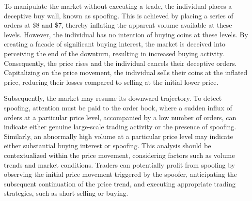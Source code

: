 To manipulate the market without executing a trade, the individual places a deceptive buy wall, known as spoofing. This
is achieved by placing a series of orders at \$8 and \$7, thereby inflating the apparent volume available at these levels.
However, the individual has no intention of buying coins at these levels. By creating a facade of significant buying
interest, the market is deceived into perceiving the end of the downturn, resulting in increased buying activity.
Consequently, the price rises and the individual cancels their deceptive orders. Capitalizing on the price movement, the
individual sells their coins at the inflated price, reducing their losses compared to selling at the initial lower price.

Subsequently, the market may resume its downward trajectory. To detect spoofing, attention must be paid to the order book,
where a sudden influx of orders at a particular price level, accompanied by a low number of orders, can indicate either
genuine large-scale trading activity or the presence of spoofing. Similarly, an abnormally high volume at a particular
price level may indicate either substantial buying interest or spoofing. This analysis should be contextualized within
the price movement, considering factors such as volume trends and market conditions. Traders can potentially profit from
spoofing by observing the initial price movement triggered by the spoofer, anticipating the subsequent continuation of
the price trend, and executing appropriate trading strategies, such as short-selling or buying.
